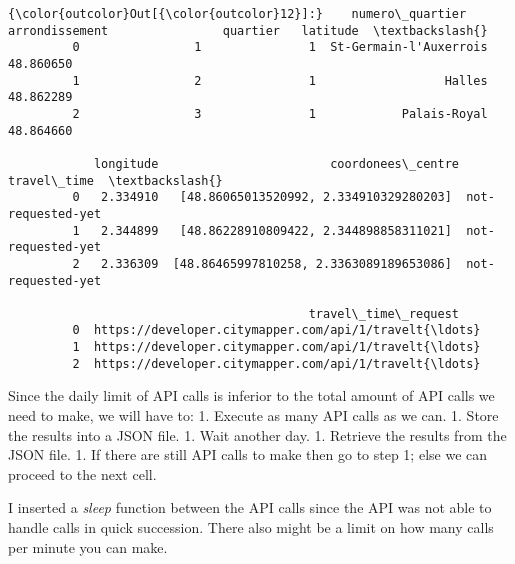 \documentclass[11pt]{article}
\begin{document}
\begin{Verbatim}[commandchars=\\\{\}]
{\color{outcolor}Out[{\color{outcolor}12}]:}    numero\_quartier  arrondissement                quartier   latitude  \textbackslash{}
         0                1               1  St-Germain-l'Auxerrois  48.860650   
         1                2               1                  Halles  48.862289   
         2                3               1            Palais-Royal  48.864660   
         
            longitude                        coordonees\_centre        travel\_time  \textbackslash{}
         0   2.334910   [48.86065013520992, 2.334910329280203]  not-requested-yet   
         1   2.344899   [48.86228910809422, 2.344898858311021]  not-requested-yet   
         2   2.336309  [48.86465997810258, 2.3363089189653086]  not-requested-yet   
         
                                          travel\_time\_request  
         0  https://developer.citymapper.com/api/1/travelt{\ldots}  
         1  https://developer.citymapper.com/api/1/travelt{\ldots}  
         2  https://developer.citymapper.com/api/1/travelt{\ldots}  
\end{Verbatim}
            
    Since the daily limit of API calls is inferior to the total amount of
API calls we need to make, we will have to: 1. Execute as many API calls
as we can. 1. Store the results into a JSON file. 1. Wait another day.
1. Retrieve the results from the JSON file. 1. If there are still API
calls to make then go to step 1; else we can proceed to the next cell.

I inserted a \emph{sleep} function between the API calls since the API
was not able to handle calls in quick succession. There also might be a
limit on how many calls per minute you can make.
\end{document}
